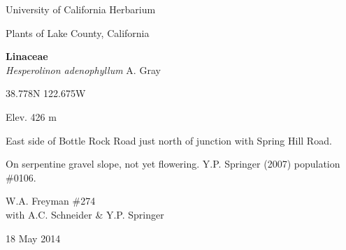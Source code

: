 \documentclass[letterpaper,10pt]{article}
\begin{document}
\begin{minipage}[t]{0.40\textwidth}

\begin{center}
University of California Herbarium \\
\begin{large}
Plants of Lake County, California \\
\end{large}
\vspace{\baselineskip}
\textbf{Linaceae} \\
\textit{Hesperolinon adenophyllum} A. Gray\\
\end{center}

\begin{footnotesize}

\begin{multicols}{2}
38.778\textdegree N 122.675\textdegree W
\columnbreak
\begin{flushright}
Elev. 426 m
\end{flushright}
\end{multicols}

East side of Bottle Rock Road just north of junction with Spring Hill Road.
\vspace{\baselineskip}

On serpentine gravel slope, not yet flowering. Y.P. Springer (2007) population \#0106.

\begin{multicols}{2}
W.A. Freyman \#274 \\
with A.C. Schneider \& Y.P. Springer
\columnbreak
\begin{flushright}
18 May 2014
\end{flushright}
\end{multicols}

\end{footnotesize}

\end{minipage}

\vspace{2cm}
%
%

%
%
\end{document}
